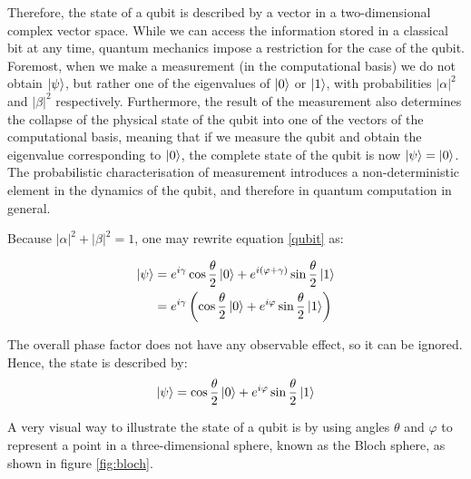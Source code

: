 \documentclass[12pt, twoside, openany]{book}
\begin{document}
Therefore, the state of a qubit is described by a vector in a two-dimensional complex vector space. While we can access the information stored in a classical bit at any time, quantum mechanics impose a restriction for the case of the qubit. Foremost, when we make a measurement (in the computational basis) we do not obtain $\ket{\psi}$, but rather one of the eigenvalues of $\ket{0}$ or $\ket{1}$, with probabilities $|\alpha|^2$ and $|\beta|^2$ respectively. Furthermore, the result of the measurement also determines the collapse of the physical state of the qubit into one of the vectors of the computational basis, meaning that if we measure the qubit and obtain the eigenvalue corresponding to $\ket{0}$, the complete state of the qubit is now $\ket{\psi} = \ket{0}$. The probabilistic characterisation of measurement introduces a non-deterministic element in the dynamics of the qubit, and therefore in quantum computation in general.

Because $|\alpha|^2 + |\beta|^2 = 1$, one may rewrite equation \ref{qubit} as:

\begin{equation} \label{qubit2}
    \begin{aligned}
        \ket{\psi} &= e^{i\gamma} \cos \frac{\theta}{2} \ket{0} + e^{i(\varphi+\gamma)} \sin \frac{\theta}{2} \ket{1} \\
        &= e^{i\gamma} \left(\cos \frac{\theta}{2} \ket{0} + e^{i\varphi} \sin \frac{\theta}{2} \ket{1} \right)
    \end{aligned}
\end{equation}

The overall phase factor does not have any observable effect, so it can be ignored. Hence, the state is described by:
\begin{equation} \label{qubit3}
    \ket{\psi} = \cos \frac{\theta}{2} \ket{0} + e^{i\varphi} \sin \frac{\theta}{2} \ket{1} 
\end{equation}

A very visual way to illustrate the state of a qubit is by using angles $\theta$ and $\varphi$ to represent a point in a three-dimensional sphere, known as the Bloch sphere, as shown in figure \ref{fig:bloch}.
\end{document}
